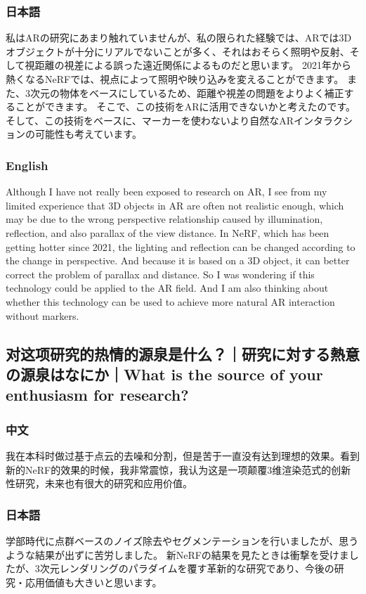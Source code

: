 \documentclass[lang=cn,11pt,a4paper]{elegantpaper}
\begin{document}
\subsubsection{日本語}
私はARの研究にあまり触れていませんが、私の限られた経験では、ARでは3Dオブジェクトが十分にリアルでないことが多く、それはおそらく照明や反射、そして視距離の視差による誤った遠近関係によるものだと思います。 2021年から熱くなるNeRFでは、視点によって照明や映り込みを変えることができます。 また、3次元の物体をベースにしているため、距離や視差の問題をよりよく補正することができます。 そこで、この技術をARに活用できないかと考えたのです。 そして、この技術をベースに、マーカーを使わないより自然なARインタラクションの可能性も考えています。
\subsubsection{English}
Although I have not really been exposed to research on AR, I see from my limited experience that 3D objects in AR are often not realistic enough, which may be due to the wrong perspective relationship caused by illumination, reflection, and also parallax of the view distance. In NeRF, which has been getting hotter since 2021, the lighting and reflection can be changed according to the change in perspective. And because it is based on a 3D object, it can better correct the problem of parallax and distance. So I was wondering if this technology could be applied to the AR field. And I am also thinking about whether this technology can be used to achieve more natural AR interaction without markers.

\subsection{对这项研究的热情的源泉是什么？｜研究に対する熱意の源泉はなにか｜What is the source of your enthusiasm for research?}
\subsubsection{中文}
我在本科时做过基于点云的去噪和分割，但是苦于一直没有达到理想的效果。看到新的NeRF的效果的时候，我非常震惊，我认为这是一项颠覆3维渲染范式的创新性研究，未来也有很大的研究和应用价值。
\subsubsection{日本語}
学部時代に点群ベースのノイズ除去やセグメンテーションを行いましたが、思うような結果が出ずに苦労しました。 新NeRFの結果を見たときは衝撃を受けましたが、3次元レンダリングのパラダイムを覆す革新的な研究であり、今後の研究・応用価値も大きいと思います。
\end{document}
